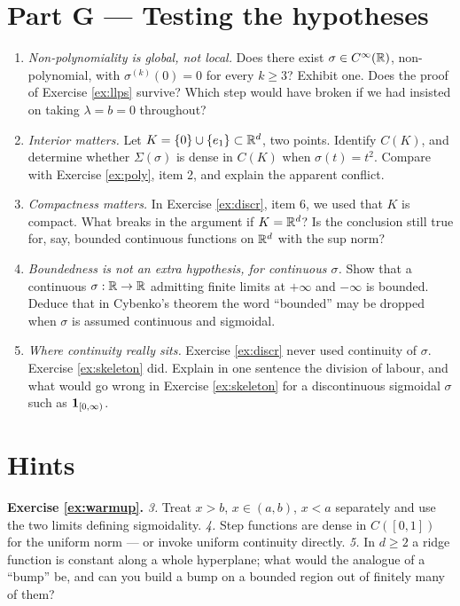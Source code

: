\documentclass[11pt,a4paper]{article}
\begin{document}
\section{Part G --- Testing the hypotheses}

\begin{exercise}\label{ex:hypotheses}
\leavevmode
\begin{enumerate}[label=\textbf{\arabic*.}]
\item \emph{Non-polynomiality is global, not local.} Does there exist $\sigma \in C^\infty(\mathbb{R})$,
non-polynomial, with $\sigma^{(k)}(0) = 0$ for every $k \ge 3$? Exhibit one. Does the proof of
Exercise \ref{ex:llps} survive? Which step would have broken if we had insisted on taking
$\lambda = b = 0$ throughout?
\item \emph{Interior matters.} Let $K = \{0\} \cup \{e_1\} \subset \mathbb{R}^d$, two points. Identify
$C(K)$, and determine whether $\Sigma(\sigma)$ is dense in $C(K)$ when $\sigma(t) = t^2$. Compare
with Exercise \ref{ex:poly}, item 2, and explain the apparent conflict.
\item \emph{Compactness matters.} In Exercise \ref{ex:discr}, item 6, we used that $K$ is compact.
What breaks in the argument if $K = \mathbb{R}^d$? Is the conclusion still true for, say, bounded continuous
functions on $\mathbb{R}^d$ with the sup norm?
\item \emph{Boundedness is not an extra hypothesis, for continuous $\sigma$.} Show that a continuous
$\sigma : \mathbb{R} \to \mathbb{R}$ admitting finite limits at $+\infty$ and $-\infty$ is bounded. Deduce that in
Cybenko's theorem the word ``bounded'' may be dropped when $\sigma$ is assumed continuous and
sigmoidal.
\item \emph{Where continuity really sits.} Exercise \ref{ex:discr} never used continuity of
$\sigma$. Exercise \ref{ex:skeleton} did. Explain in one sentence the division of labour, and what
would go wrong in Exercise \ref{ex:skeleton} for a discontinuous sigmoidal $\sigma$ such as
$\mathbf{1}_{[0,\infty)}$.
\end{enumerate}
\end{exercise}

\newpage
\section{Hints}

\noindent
\textbf{Exercise \ref{ex:warmup}.}
\emph{3.} Treat $x > b$, $x \in (a,b)$, $x < a$ separately and use the two limits defining
sigmoidality. \emph{4.} Step functions are dense in $C([0,1])$ for the uniform norm --- or invoke
uniform continuity directly. \emph{5.} In $d \ge 2$ a ridge function is constant along a whole
hyperplane; what would the analogue of a ``bump'' be, and can you build a bump on a bounded region
out of finitely many of them?
\end{document}
